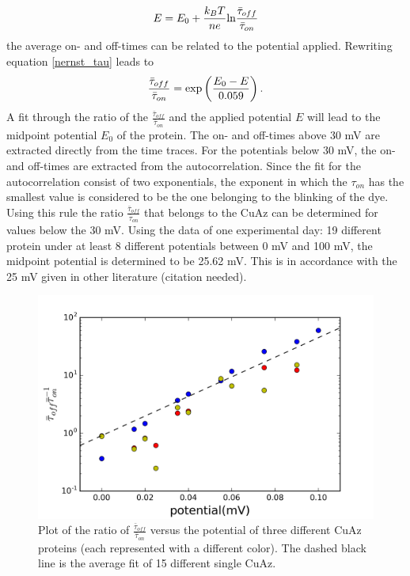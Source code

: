 \documentclass[twoside,single]{lion-msc}
\begin{document}
\begin{equation}\label{nernst_tau}
E = E_{0}+\frac{k_{B}T}{ne}\textup{ln}\frac{\bar{\tau}_{off}}{\bar{\tau}_{on}}
\end{equation}
the average on- and off-times can be related to the potential applied. Rewriting equation \ref{nernst_tau} leads to
\begin{equation}\label{fit_onoff}
\frac{\bar{\tau}_{off}}{\bar{\tau}_{on}} = \textup{exp}\left ( \frac{E_{0}-E}{0.059} \right ).
\end{equation}
A fit through the ratio of the $\frac{\bar{\tau}_{off}}{\bar{\tau}_{on}}$ and the applied potential $E$ will lead to the midpoint potential $E_{0}$ of the protein. The on- and off-times above 30 mV are extracted directly from the time traces. For the potentials below 30 mV, the on- and off-times are extracted from the autocorrelation. Since the fit for the autocorrelation consist of two exponentials, the exponent in which the $\tau_{on}$ has the smallest value is considered to be the one belonging to the blinking of the dye. Using this rule the ratio $\frac{\bar{\tau}_{off}}{\bar{\tau}_{on}}$ that belongs to the CuAz can be determined for values below the 30 mV. Using the data of one experimental day: 19 different protein under at least 8 different potentials between 0 mV and 100 mV, the midpoint potential is determined to be 25.62 mV. This is in accordance with the 25 mV given in other literature (citation needed). 

\begin{figure}[ht!]
\centering
\includegraphics[width=.9\textwidth]{t_ratio_plot}
\caption{Plot of the ratio of $\frac{\bar{\tau}_{off}}{\bar{\tau}_{on}}$ versus the potential of three different CuAz proteins (each represented with a different color). The dashed black line is the average fit of 15 different single CuAz.}
\label{t_ratio_plot}
\end{figure}
\end{document}

